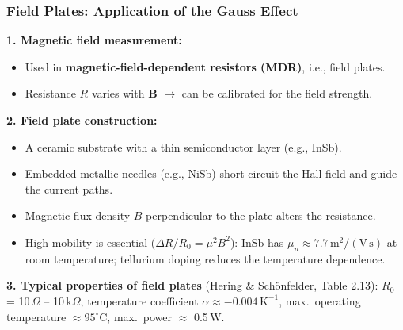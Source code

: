 \begin{frame}
	\frametitle{Field Plates: Application of the Gauss Effect}
	\small
	\textbf{1. Magnetic field measurement:}
	\begin{itemize}
		\item Used in \textbf{magnetic-field-dependent resistors (MDR)}, i.e., field plates.
		\item Resistance $R$ varies with $\mathbf{B}$ $\rightarrow$ can be calibrated for the field strength.
	\end{itemize}
	\textbf{2. Field plate construction:}
	\begin{itemize}
		\item A ceramic substrate with a thin semiconductor layer (e.g., InSb).
		\item Embedded metallic needles (e.g., NiSb) short-circuit the Hall field and guide the current paths.
		\item Magnetic flux density $B$ perpendicular to the plate alters the resistance.
		\item High mobility is essential ($\Delta R/R_0 = \mu^2 B^2$): InSb has $\mu_n \approx 7.7\,\mathrm{m^2/(V\,s)}$ at room temperature; tellurium doping reduces the temperature dependence.
	\end{itemize}
	\textbf{3. Typical properties of field plates} (Hering \& Schönfelder, Table 2.13): $R_0$ = 10\,$\Omega$ -- 10\,k$\Omega$, temperature coefficient $\alpha \approx -0.004\,\text{K}^{-1}$, max.\ operating temperature $\approx 95^\circ$C, max.\ power $\approx$ 0.5\,W.
\end{frame}

